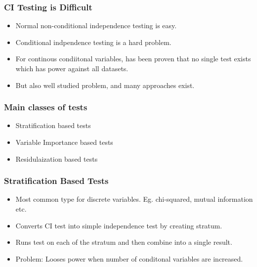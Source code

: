 \documentclass{beamer}
\begin{document}
\begin{frame}
	\frametitle{CI Testing is Difficult}
	\begin{itemize}
		\setlength\itemsep{1em}
		\item Normal non-conditional independence testing is easy.
		\item Conditional indpendence testing is a hard problem.
		\item For continous condiitonal variables, has been proven that no single 
		      test exists which has power against all datasets. \footnotemark
		\item But also well studied problem, and many approaches exist.
	\end{itemize}

\end{frame}

\begin{frame}
	\frametitle{Main classes of tests}
	\begin{itemize}
		\setlength\itemsep{1em}
		\item Stratification based tests
		\item Variable Importance based tests
		\item Residulaization based tests
	\end{itemize}
\end{frame}

\begin{frame}
	\frametitle{Stratification Based Tests}
	\begin{itemize}
		\setlength\itemsep{1em}
		\item Most common type for discrete variables. Eg. chi-squared,
			mutual information etc. 
		\item Converts CI test into simple independence test by creating 
			stratum. 
		\item Runs test on each of the stratum and then combine into a 
			single result.
		\item Problem: Looses power when number of conditonal variables
			are increased.
	\end{itemize}
\end{frame}
\end{document}

